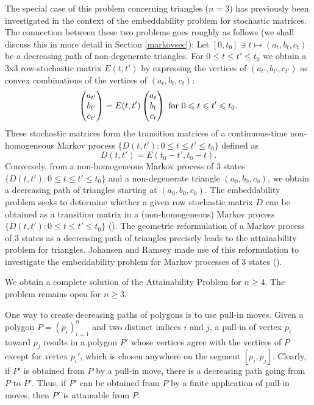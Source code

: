 \documentclass[11pt]{amsart}
\theoremstyle{remark}
\numberwithin{equation}{section}
\renewcommand{\leq}{\leqslant}
\renewcommand{\geq}{\geqslant}
\begin{document}
The special case of this problem concerning triangles ($n=3$) has previously been investigated in the context of the embeddability problem for stochastic matrices. The connection between these two problems goes roughly as follows (we shall discuss this in more detail in Section \ref{markovsec}): Let $[0,t_0]\ni t\mapsto (a_t,b_t,c_t)$  be  a decreasing path of non-degenerate triangles. For  $0\leq t\leq t'\leq t_0$ we obtain a
 3x3 row-stochastic matrix $E(t,t')$ by expressing the vertices of $(a_{t'},b_{t'},c_{t'})$ as convex combinations of the vertices of $(a_{t},b_{t},c_{t})$:
\[
\begin{pmatrix}
a_{t'}\\b_{t'}\\c_{t'}
\end{pmatrix}=E(t,t')
\begin{pmatrix}
a_{t}\\b_{t}\\c_{t}
\end{pmatrix}\hbox{ for }0\leq t\leq t'\leq t_0.
\]
These stochastic matrices form the transition matrices of 
a continuous-time non-homogeneous Markov process $\{D(t,t'):0\leq t\leq t'\leq t_0\}$ defined as 
\[
D(t,t')=E(t_0-t',t_0-t).
\] 
Conversely,  from a non-homogeneous Markov process of 3 states $\{D(t,t'):0\leq t\leq t'\leq t_0\}$ and a non-degenerate triangle $(a_0,b_0,c_0)$,
we obtain a decreasing path of triangles starting at $(a_0,b_0,c_0)$.
The embeddability problem seeks to determine whether a given row stochastic matrix $D$ can be obtained as a transition matrix in a (non-homogeneous) Markov process $\{D(t,t'):0\leq t\leq t'\leq t_0\}$ (\cite{goodmanCIME}).  
The geometric reformulation of a Markov process of 3 states as a decreasing path of triangles precisely leads to the attainability problem for triangles. Johansen and Ramsey made use of this reformulation to investigate the embeddability problem for Markov processes of 3 states (\cite{johansen-ramsey}). 




We obtain a complete solution of the Attainability Problem for $n\geq 4$. The problem remains open for $n\geq 3$.

One way to create decreasing paths of polygons is to use pull-in moves. Given a polygon $P=(p_i)_{i=1}^n$ and two distinct indices  $i$ and $j$, a pull-in of vertex $p_i$ toward $p_j$ results in a polygon $P'$ whose vertices agree with the vertices of $P$  except for vertex $p_i'$,  which is chosen anywhere on the segment $[p_i,p_j]$.  Clearly, if $P'$ is obtained from $P$ by a pull-in move, there is a decreasing path going from $P$ to $P'$. Thus, if $P'$ can be obtained from $P$ by a finite application of pull-in moves, then $P'$ is attainable from $P$.  
\end{document}
